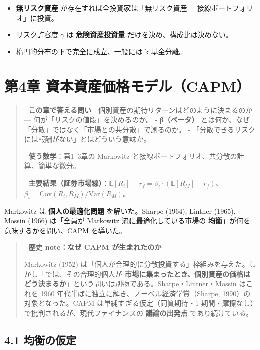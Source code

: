 \documentclass[11pt,a4paper]{report}
\begin{document}
\begin{itemize}
\item \textbf{無リスク資産} が存在すれば全投資家は「無リスク資産 + 接線ポートフォリオ」に投資。
\item リスク許容度 $\gamma$ は \textbf{危険資産投資量} だけを決め、構成比は決めない。
\item 楕円的分布の下で完全に成立、一般には k 基金分離。
\end{itemize}

\noindent\hrulefill

\chapter{第4章 資本資産価格モデル（CAPM）}

\begin{quote}
🎯 \textbf{この章で答える問い}
- 個別資産の期待リターンはどのように決まるのか — 何が「リスクの値段」を決めるのか。
- \textbf{β（ベータ）} とは何か、なぜ「分散」ではなく「市場との共分散」で測るのか。
- 「分散できるリスクには報酬がない」とはどういう意味か。

📐 \textbf{使う数学}：第1–3章の Markowitz と接線ポートフォリオ、共分散の計算、簡単な微分。

🔑 \textbf{主要結果（証券市場線）}：$\mathbb{E}[R_i] - r_f = \beta_i \cdot (\mathbb{E}[R_M] - r_f)$、$\beta_i = \mathrm{Cov}(R_i, R_M) / \mathrm{Var}(R_M)$。
\end{quote}

Markowitz は \textbf{個人の最適化問題} を解いた。Sharpe (1964), Lintner (1965), Mossin (1966) は「全員が Markowitz 流に最適化している市場の \textbf{均衡}」が何を意味するかを問い、CAPM を導いた。

\begin{quote}
📜 \textbf{歴史 note：なぜ CAPM が生まれたのか}

Markowitz (1952) は「個人が合理的に分散投資する」枠組みを与えた。しかし「では、その合理的個人が \textbf{市場に集まったとき、個別資産の価格はどう決まるか}」という問いは別物である。Sharpe・Lintner・Mossin はこれを 1960 年代半ばに独立に解き、ノーベル経済学賞（Sharpe, 1990）の対象となった。CAPM は単純すぎる仮定（同質期待・1 期間・摩擦なし）で批判されるが、現代ファイナンスの \textbf{議論の出発点} であり続けている。
\end{quote}

\section{4.1 均衡の仮定}
\end{document}
